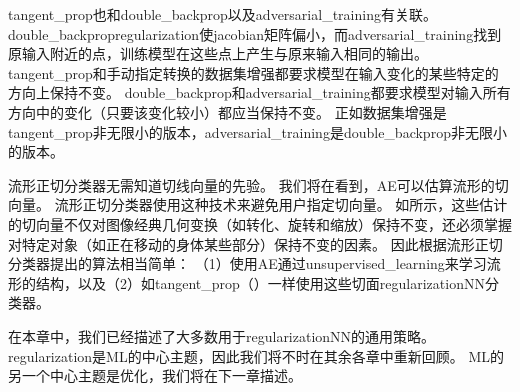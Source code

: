 
\gls{tangent_prop}也和\gls{double_backprop}\citep{DruckerLeCun92}以及\gls{adversarial_training}\citep{Szegedy-ICLR2014,Goodfellow-2015-adversarial}有关联。
\gls{double_backprop}\gls{regularization}使\gls{jacobian}矩阵偏小，而\gls{adversarial_training}找到原输入附近的点，训练模型在这些点上产生与原来输入相同的输出。
\gls{tangent_prop}和手动指定转换的数据集增强都要求模型在输入变化的某些特定的方向上保持不变。
\gls{double_backprop}和\gls{adversarial_training}都要求模型对输入所有方向中的变化（只要该变化较小）都应当保持不变。
正如数据集增强是\gls{tangent_prop}非无限小的版本，\gls{adversarial_training}是\gls{double_backprop}非无限小的版本。

流形正切分类器\citep{Dauphin-et-al-NIPS2011}无需知道切线向量的先验。
我们将在看到，\gls{AE}可以估算流形的切向量。
流形正切分类器使用这种技术来避免用户指定切向量。
如所示，这些估计的切向量不仅对图像经典几何变换（如转化、旋转和缩放）保持不变，还必须掌握对特定对象（如正在移动的身体某些部分）保持不变的因素。
因此根据流形正切分类器提出的算法相当简单：
（1）使用\gls{AE}通过\gls{unsupervised_learning}来学习流形的结构，以及（2）如\gls{tangent_prop}（）一样使用这些切面\gls{regularization}\gls{NN}分类器。

在本章中，我们已经描述了大多数用于\gls{regularization}\gls{NN}的通用策略。
\gls{regularization}是\gls{ML}的中心主题，因此我们将不时在其余各章中重新回顾。
\gls{ML}的另一个中心主题是优化，我们将在下一章描述。

